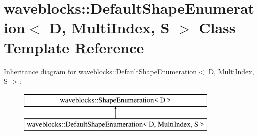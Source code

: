 \hypertarget{classwaveblocks_1_1_default_shape_enumeration}{}\section{waveblocks\+:\+:Default\+Shape\+Enumeration$<$ D, Multi\+Index, S $>$ Class Template Reference}
\label{classwaveblocks_1_1_default_shape_enumeration}
Inheritance diagram for waveblocks\+:\+:Default\+Shape\+Enumeration$<$ D, Multi\+Index, S $>$\+:\begin{figure}[H]
\begin{center}
\leavevmode
\includegraphics[height=2.000000cm]{classwaveblocks_1_1_default_shape_enumeration}
\end{center}
\end{figure}

